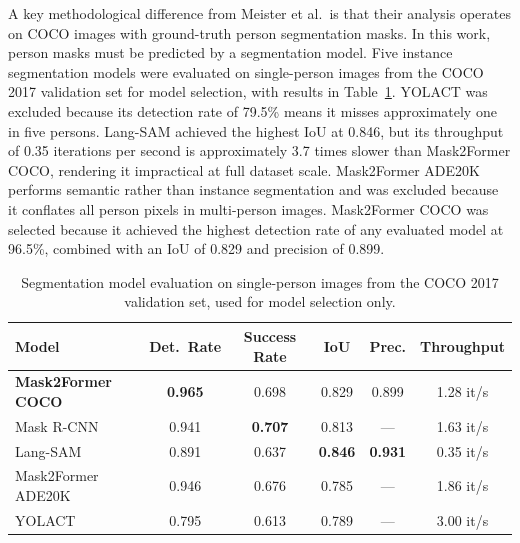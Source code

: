A key methodological difference from Meister et al.\ is that their analysis operates on COCO images with ground-truth person segmentation masks. In this work, person masks must be predicted by a segmentation model. Five instance segmentation models were evaluated on single-person images from the COCO 2017 validation set for model selection, with results in Table~\ref{tab:occlusion_model_eval}. YOLACT was excluded because its detection rate of 79.5\% means it misses approximately one in five persons. Lang-SAM achieved the highest IoU at 0.846, but its throughput of 0.35 iterations per second is approximately 3.7 times slower than Mask2Former COCO, rendering it impractical at full dataset scale. Mask2Former ADE20K performs semantic rather than instance segmentation and was excluded because it conflates all person pixels in multi-person images. Mask2Former COCO was selected because it achieved the highest detection rate of any evaluated model at 96.5\%, combined with an IoU of 0.829 and precision of 0.899.

\begin{table}[htbp]
	\centering
	\footnotesize
	\begin{tabular}{lccccc}
		\hline
		\textbf{Model}            & \textbf{Det.\ Rate} &
		\textbf{Success Rate}     & \textbf{IoU}        &
		\textbf{Prec.}            & \textbf{Throughput}                                                                \\
		\hline
		\textbf{Mask2Former COCO} & \textbf{0.965}      & 0.698          & 0.829          & 0.899          & 1.28 it/s \\
		Mask R-CNN                & 0.941               & \textbf{0.707} & 0.813          & ---            & 1.63 it/s \\
		Lang-SAM                  & 0.891               & 0.637          & \textbf{0.846} & \textbf{0.931} & 0.35 it/s \\
		Mask2Former ADE20K        & 0.946               & 0.676          & 0.785          & ---            & 1.86 it/s \\
		YOLACT                    & 0.795               & 0.613          & 0.789          & ---            & 3.00 it/s \\
		\hline
	\end{tabular}
	\caption{Segmentation model evaluation on single-person images from the COCO 2017
		validation set, used for model selection only.}
	\label{tab:occlusion_model_eval}
\end{table}

